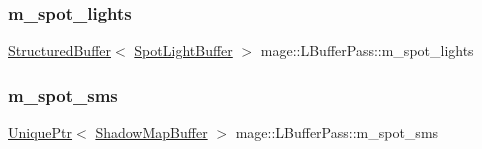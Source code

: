 \hypertarget{structmage_1_1_l_buffer_pass_af1612aa2a8d24303ebcf9e72125698f3}{}\label{structmage_1_1_l_buffer_pass_af1612aa2a8d24303ebcf9e72125698f3} 
\subsubsection{\texorpdfstring{m\+\_\+spot\+\_\+lights}{m\_spot\_lights}}
{\footnotesize\ttfamily \hyperlink{classmage_1_1_structured_buffer}{Structured\+Buffer}$<$ \hyperlink{structmage_1_1_spot_light_buffer}{Spot\+Light\+Buffer} $>$ mage\+::\+L\+Buffer\+Pass\+::m\+\_\+spot\+\_\+lights\hspace{0.3cm}{\ttfamily [private]}}

\hypertarget{structmage_1_1_l_buffer_pass_a348d64fd92b6198663494d521edcdf6b}{}\label{structmage_1_1_l_buffer_pass_a348d64fd92b6198663494d521edcdf6b} 
\subsubsection{\texorpdfstring{m\+\_\+spot\+\_\+sms}{m\_spot\_sms}}
{\footnotesize\ttfamily \hyperlink{namespacemage_a3316d7143a973e37adf1110f2e80ca31}{Unique\+Ptr}$<$ \hyperlink{structmage_1_1_shadow_map_buffer}{Shadow\+Map\+Buffer} $>$ mage\+::\+L\+Buffer\+Pass\+::m\+\_\+spot\+\_\+sms\hspace{0.3cm}{\ttfamily [private]}}

